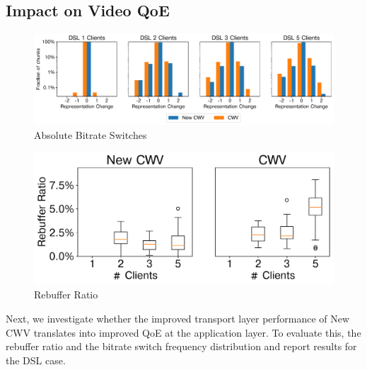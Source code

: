 \documentclass[10pt,sigconf,anonymous]{acmart}
\newcommand{\todo}[1]{\textbf{\textcolor{red}{To do: #1}}}
\begin{document}
\subsection{Impact on Video QoE}
\label{sec:QoE-impact}

\begin{figure}
  \centering
  \includegraphics[width=\textwidth, keepaspectratio]{figures/bitrate_derivative_distribution.pdf}
  \caption{Absolute Bitrate Switches}
  \label{fig:bitrate-switches}
\end{figure}

\begin{figure}
      \includegraphics[width=.45\textwidth, keepaspectratio]{figures/Rebuffer_Ratio.pdf}
    \caption{Rebuffer Ratio}
    \label{fig:rebuffer-ratio}
\end{figure}



Next, we investigate whether the improved transport layer performance of New CWV translates into improved QoE at the application layer. To evaluate this, the rebuffer ratio and the bitrate switch frequency distribution and report results for the DSL case. 

\end{document}
